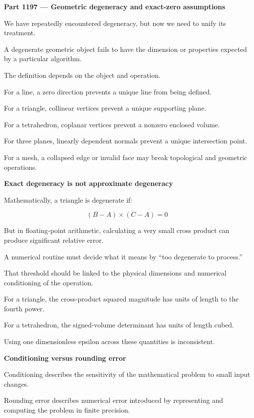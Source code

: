 \hypertarget{04-visual-computing-ii-ch023-part-vi-numerical-robustness-and-the-geometry-contract}{}

\textbf{Part 1197 --- Geometric degeneracy and exact-zero assumptions}

We have repeatedly encountered degeneracy, but now we need to unify its treatment.

A degenerate geometric object fails to have the dimension or properties expected by a particular algorithm.

The definition depends on the object and operation.

For a line, a zero direction prevents a unique line from being defined.

For a triangle, collinear vertices prevent a unique supporting plane.

For a tetrahedron, coplanar vertices prevent a nonzero enclosed volume.

For three planes, linearly dependent normals prevent a unique intersection point.

For a mesh, a collapsed edge or invalid face may break topological and geometric operations.

\textbf{Exact degeneracy is not approximate degeneracy}

Mathematically, a triangle is degenerate if:

\[
(B-A)\times(C-A)=0
\]

But in floating-point arithmetic, calculating a very small cross product can produce significant relative error.

A numerical routine must decide what it means by ``too degenerate to process.''

That threshold should be linked to the physical dimensions and numerical conditioning of the operation.

For a triangle, the cross-product squared magnitude has units of length to the fourth power.

For a tetrahedron, the signed-volume determinant has units of length cubed.

Using one dimensionless epsilon across these quantities is inconsistent.

\textbf{Conditioning versus rounding error}

Conditioning describes the sensitivity of the mathematical problem to small input changes.

Rounding error describes numerical error introduced by representing and computing the problem in finite precision.

